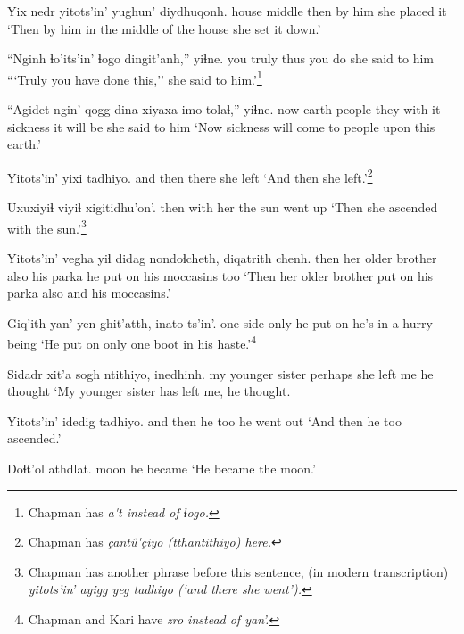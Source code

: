\documentclass[12pt]{article}
\begin{document}
\gll Yix nedr yitots'in' yughun' diydhuqonh.
house middle then {by him} {she placed it}
\glt `Then by him in the middle of the house she set it down.'
\glend

\gll ``Nginh ɬo'its'in' ɬogo dingit'anh,''  yiɬne.
you  truly thus {you do} {she said to him}
\glt ```Truly you have done this,'' she said to him.'\footnote{Chapman has \em a\'{}t \em instead of \em ɬogo.}
\glend

\gll ``Agidet {ngin' qogg} dina xiyaxa imo  tolaɬ,'' yiɬne.
now  earth people  {they with it}  sickness {it will be} {she said to him}
\glt `Now sickness will come to people upon this earth.'
\glend

\gll Yitots'in' yixi tadhiyo.
{and then} there {she left}
\glt `And then she left.'\footnote{Chapman has \em \c{c}ant\^u\'{}\c{c}iyo (tthantithiyo) \em here.}
\glend

\gll Uxuxiyiɬ viyiɬ xigitidhu'on'.
then {with her} {the sun went up}
\glt `Then she ascended with the sun.'\footnote{Chapman has another phrase before this sentence, (in modern transcription) \em yitots'in' ayigg yeg tadhiyo \em (`and there she went').}
\glend

\gll Yitots'in' vegha   yiɬ didag  nondoɬcheth,  diqatrith chenh.
then {her older brother} also {his parka} {he put on}  {his moccasins} too
\glt `Then her older brother put on his parka also and his moccasins.'
\glend

\gll Giq'ith yan' yen-ghit'atth, inato ts'in'.
{one side} only {he put on} {he's in a hurry} being
\glt `He put on only one boot in his haste.'\footnote{Chapman and Kari have \em zro \em instead of \em yan'.}
\glend

\gll Sidadr  xit'a  {sogh ntithiyo,} inedhinh.
{my younger sister} perhaps {she left me} {he thought}
\glt `My younger sister has left me, he thought.
\glend

\gll Yitots'in' idedig tadhiyo. 
{and then} {he too} {he went out} 
\glt `And then he too ascended.'
\glend

\gll Doɬt'ol athdlat.
moon  {he became}
\glt `He became the moon.'
\glend
\end{document}

